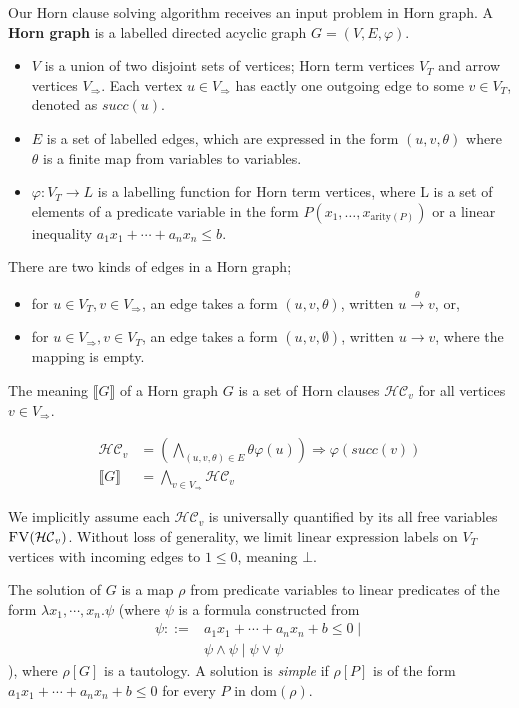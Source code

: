\documentclass[a4paper,12pt]{article}
\newcommand{\edge}[2]{#1\rightarrow#2}
\newcommand{\edgel}[3]{#1\xrightarrow{#2}#3}
\begin{document}
Our Horn clause solving algorithm receives an input problem in Horn
graph. A \textbf{Horn graph} is a labelled directed acyclic graph $G=(V,E,\varphi)$.
\begin{itemize}
\item $V$ is a union of two disjoint sets of vertices; Horn term
  vertices $V_T$ and arrow vertices $V_\Rightarrow$. Each vertex $u
  \in V_\Rightarrow$ has eactly one outgoing edge to some $v \in V_T$,
  denoted as $succ(u)$.
\item $E$ is a set of labelled edges, which are expressed in the form
  $(u,v,\theta)$ where $\theta$ is a finite map from variables to
  variables.
\item $\varphi: V_T \rightarrow L$ is a labelling function for Horn
  term vertices, where L is a set of elements of a predicate variable
  in the form $P(x_1, \ldots, x_{\mathrm{arity}(P)})$ or a linear
  inequality $a_1 x_1 + \cdots + a_n x_n \leq b$.
\end{itemize}
There are two kinds of edges in a Horn graph;
\begin{itemize}
\item for $u \in V_T, v \in V_\Rightarrow$, an edge takes a form
  $(u,v,\theta)$, written $\edgel{u}{\theta}{v}$, or,
\item for $u \in V_\Rightarrow, v \in V_T$, an edge takes a form
  $(u,v,\emptyset)$, written $\edge{u}{v}$, where the mapping is
  empty.
\end{itemize}

The meaning $\llbracket G \rrbracket $ of a Horn graph $G$ is a set of
Horn clauses $\mathcal{HC}_v$ for all vertices $v \in V_\Rightarrow$.

\begin{align*}
\mathcal{HC}_v & = \left( \bigwedge_{(u,v,\theta) \in E} \theta \varphi(u) \right) \Longrightarrow \varphi(succ(v)) \\
\llbracket G \rrbracket & = \bigwedge_{v \in V_\Rightarrow} \mathcal{HC}_v
\end{align*}

We implicitly assume each $\mathcal{HC}_v$ is universally quantified
by its all free variables $\textsc{FV}(\mathcal{HC}_v)$.  Without loss
of generality, we limit linear expression labels on $V_T$ vertices
with incoming edges to $1 \leq 0$, meaning $\bot$.

The solution of $G$ is a map $\rho$ from predicate variables to linear
predicates of the form $\lambda x_1, \cdots ,x_n. \psi $ (where $\psi$
is a formula constructed from
\begin{align*}
\psi ::= & a_1 x_1 + \cdots + a_n x_n + b \leq 0 \mid \\
& \psi \wedge \psi \mid \psi \vee \psi
\end{align*}
), where $\rho[G]$ is a tautology. A solution is \textit{simple} if
$\rho[P]$ is of the form $a_1 x_1 + \cdots + a_n x_n + b \leq 0$ for every
$P$ in $\mathrm{dom}(\rho)$.
\end{document}
